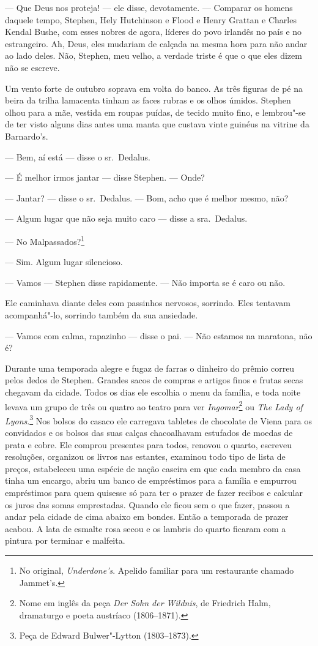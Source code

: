  --- Que Deus nos proteja! --- ele disse, devotamente. --- Comparar os homens
daquele tempo, Stephen, Hely Hutchinson e Flood e Henry Grattan e
Charles Kendal Bushe, com esses nobres de agora, líderes do povo
irlandês no país e no estrangeiro. Ah, Deus, eles mudariam de calçada
na mesma hora para não andar ao lado deles. Não, Stephen, meu velho, a
verdade triste é que o que eles dizem não se escreve.

Um vento forte de outubro soprava em volta do banco. As três figuras de
pé na beira da trilha lamacenta tinham as faces rubras e os olhos
úmidos. Stephen olhou para a mãe, vestida em roupas puídas, de tecido
muito fino, e lembrou"-se de ter visto alguns dias antes uma manta que custava
vinte guinéus na vitrine da Barnardo’s.

 --- Bem, aí está --- disse o sr.~Dedalus.

 --- É melhor irmos jantar --- disse Stephen. --- Onde?

 --- Jantar? --- disse o sr.~Dedalus. --- Bom, acho que é melhor mesmo, não?

 --- Algum lugar que não seja muito caro --- disse a sra.~Dedalus.

 --- No Malpassados?\footnote{ No original, \textit{Underdone’s}. Apelido
familiar para um restaurante chamado Jammet’s.}

 --- Sim. Algum lugar silencioso.

 --- Vamos --- Stephen disse rapidamente. --- Não importa se é caro ou não.

Ele caminhava diante deles com passinhos nervosos, sorrindo. Eles
tentavam acompanhá"-lo, sorrindo também da sua ansiedade.

 --- Vamos com calma, rapazinho --- disse o pai. --- Não estamos na maratona, não
é?

Durante uma temporada alegre e fugaz de farras o dinheiro do prêmio
correu pelos dedos de Stephen. Grandes sacos de compras e artigos finos
e frutas secas chegavam da cidade. Todos os dias ele escolhia o menu da
família, e toda noite levava um grupo de três ou quatro ao teatro para
ver \textit{Ingomar}\footnote{ Nome em inglês da peça \textit{Der Sohn der Wildnis}, de Friedrich Halm, dramaturgo e poeta austríaco (1806--1871).} ou \textit{The Lady of Lyons}.\footnote{ Peça de Edward Bulwer"-Lytton (1803--1873).} Nos bolsos do
casaco ele carregava tabletes de chocolate de Viena para os convidados
e os bolsos das suas calças chacoalhavam estufados de moedas de prata e
cobre. Ele comprou presentes para todos, renovou o quarto, escreveu
resoluções, organizou os livros nas estantes,
examinou todo tipo de lista de preços, estabeleceu uma espécie de nação
caseira em que cada membro da casa tinha um encargo, abriu um banco de
empréstimos para a família e empurrou empréstimos para quem quisesse só
para ter o prazer de fazer recibos e calcular os juros das somas
emprestadas. Quando ele ficou sem o que fazer, passou a andar pela
cidade de cima abaixo em bondes. Então a temporada de prazer acabou. A
lata de esmalte rosa secou e os lambris do quarto ficaram com a pintura
por terminar e malfeita.

